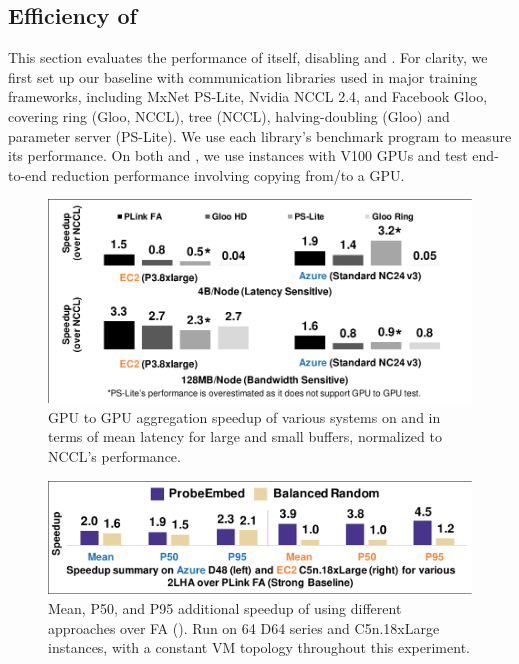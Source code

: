 \subsection{Efficiency of \ha}
\label{sec:baseline}
This section evaluates the performance of \ha itself, disabling \marcopolo{} and \autoplink{}. %
For clarity, we first set up our baseline with communication libraries used in major training frameworks, including MxNet PS-Lite, Nvidia NCCL 2.4, and Facebook Gloo, covering ring (Gloo, NCCL), tree (NCCL), halving-doubling (Gloo) and parameter server (PS-Lite). %
We use each library's benchmark program to measure its performance. On both \azure and \ectwo, we use instances with V100 GPUs and test end-to-end reduction performance
involving copying from/to a GPU. %

\begin{figure}[t!]
	\centering
	\includegraphics[width=.5\linewidth, trim=2 3 3 3,clip]{Figures/baseline.pdf}
	\caption{GPU to GPU aggregation speedup of various systems on \azure and \ectwo in terms of mean latency for large and small buffers, normalized to NCCL's performance. }
	\label{fig:baseline}
\end{figure}

\begin{figure}[t!]
	\centering
	\includegraphics[width=.5\linewidth, trim=2 3 3 3,clip]{Figures/perfSummary.pdf}
	\caption{Mean, P50, and P95 additional speedup of \mlha using different approaches over FA (\strongbaseline). Run on 64 \azure D64 series and \ectwo C5n.18xLarge instances, with a constant VM topology throughout this experiment.}%
	\label{fig:perfSummary}
\end{figure}


